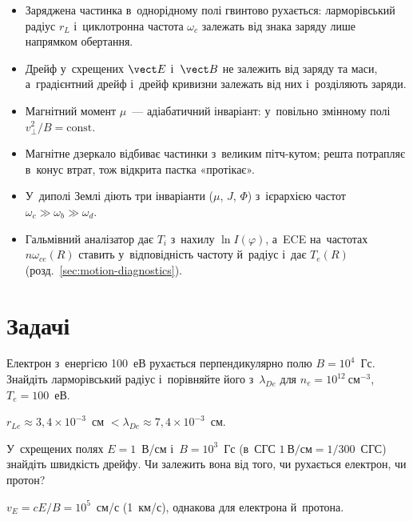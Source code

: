 \begin{Summary}
\begin{itemize}
\item Заряджена частинка в~однорідному полі гвинтово рухається: ларморівський радіус $r_L$ і~циклотронна частота $\omega_c$ залежать від знака заряду лише напрямком обертання.
\item Дрейф у~схрещених $\vect E$ і~$\vect B$ не залежить від заряду та маси, а~градієнтний дрейф і~дрейф кривизни залежать від них і~розділяють заряди.
\item Магнітний момент $\mu$~--- адіабатичний інваріант: у~повільно змінному полі $v_\perp^2/B=\mathrm{const}$.
\item Магнітне дзеркало відбиває частинки з~великим пітч-кутом; решта потрапляє в~конус втрат, тож відкрита пастка «протікає».
\item У~диполі Землі діють три інваріанти ($\mu$, $J$, $\Phi$) з~ієрархією частот $\omega_c\gg\omega_b\gg\omega_d$.
\item Гальмівний аналізатор дає $T_i$ з~нахилу $\ln I(\varphi)$, а~ECE на~частотах $n\omega_{ce}(R)$ ставить у~відповідність частоту й~радіус і~дає $T_e(R)$ (розд.~\ref{sec:motion-diagnostics}).
\end{itemize}
\end{Summary}

\section*{Задачі}

\begin{problem}\label{prb:PlasmaLarmor}
	Електрон з~енергією 100~еВ рухається перпендикулярно полю $B=10^4$~Гс. Знайдіть
	ларморівський радіус і~порівняйте його з~$\lambda_{De}$ для
	$n_e=10^{12}~\mathrm{см}^{-3}$, $T_e=100$~еВ.
	\begin{solution}
		$r_{Le}\approx3{,}4\times10^{-3}$~см $<\lambda_{De}\approx7{,}4\times10^{-3}$~см.
	\end{solution}
\end{problem}

\begin{problem}\label{prb:PlasmaExB}
	У~схрещених полях $E=1$~В/см і~$B=10^3$~Гс (в~СГС $1~\text{В/см}=1/300$~СГС) знайдіть
	швидкість дрейфу. Чи залежить вона від того, чи рухається електрон, чи протон?
	\begin{solution}
		$v_E=cE/B=10^{5}$~см/с (1~км/с), однакова для електрона й~протона.
	\end{solution}
\end{problem}

